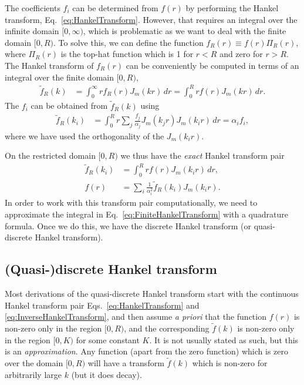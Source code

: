 \documentclass[aip,amsmath,amssymb,reprint,twocolumn]{revtex4-1}
\begin{document}
The coefficients $f_i$ can be determined from $f(r)$ by performing the Hankel transform, Eq.~\eqref{eq:HankelTransform}.  However, that requires an integral over the infinite domain $[0, \infty)$, which is problematic as we want to deal with the finite domain $[0, R)$.  To solve this, we can define the function $f_R(r) \equiv f(r) \Pi_R(r)$, where $\Pi_R(r)$ is the top-hat function which is 1 for $r < R$ and zero for $r > R$.  The Hankel transform of $f_R(r)$ can be conveniently be computed in terms of an integral over the finite domain $[0, R)$,
\begin{align}
  \tilde{f}_R(k) &= \int_0^\infty r f_R(r) J_m(k r)\, dr = \int_0^R r f(r) J_m(k r)\, dr.
\end{align}
The $f_i$ can be obtained from $\tilde{f}_R(k)$ using
\begin{align}
  \tilde{f}_R(k_i) &= \int_0^R r \sum_j \frac{f_j}{\alpha_j} J_m(k_j r) J_m(k_i r)\, dr = \alpha_i f_i,
\end{align}
where we have used the orthogonality of the $J_m(k_i r)$.

On the restricted domain $[0, R)$ we thus have the \emph{exact} Hankel transform pair
\begin{align}
  \tilde{f}_R(k_i) &= \int_0^R r f(r) J_m(k_i r)\, dr, \label{eq:FiniteHankelTransform}\\
  f(r) &= \sum_i \frac{1}{\alpha_i^2} \tilde{f}_R(k_i) J_m(k_i r). \label{eq:FiniteInverseHankelTransform}
\end{align}
In order to work with this transform pair computationally, we need to approximate the integral in Eq.~\eqref{eq:FiniteHankelTransform} with a quadrature formula.  Once we do this, we have the discrete Hankel transform (or quasi-discrete Hankel transform).

\subsection{(Quasi-)discrete Hankel transform}

Most derivations of the quasi-discrete Hankel transform start with the continuous Hankel transform pair Eqs.~\eqref{eq:HankelTransform} and \eqref{eq:InverseHankelTransform}, and then assume \emph{a priori} that the function $f(r)$ is non-zero only in the region $[0, R)$, and the corresponding $\tilde{f}(k)$ is non-zero only in the region $[0, K)$ for some constant $K$.  It is not usually stated as such, but this is an \emph{approximation}.  Any function (apart from the zero function) which is zero over the domain $[0, R)$ will have a transform $\tilde{f}(k)$ which is non-zero for arbitrarily large $k$ (but it does decay).
\end{document}
